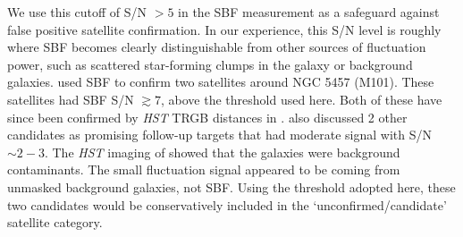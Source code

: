 \documentclass[twocolumn]{aastex62}
\begin{document}
We use this cutoff of S/N $>5$ in the SBF measurement as a safeguard against false positive satellite confirmation. In our experience, this S/N level is roughly where SBF becomes clearly distinguishable from other sources of fluctuation power, such as scattered star-forming clumps in the galaxy or background galaxies. \citet{sbf_m101} used SBF to confirm two satellites around NGC 5457 (M101). These satellites had SBF S/N $\gtrsim7$, above the threshold used here. Both of these have since been confirmed by \emph{HST} TRGB distances in \citet{bennet2019}. \citet{sbf_m101} also discussed 2 other candidates as promising follow-up targets that had moderate signal with S/N$\sim2-3$. The \emph{HST} imaging of \citet{bennet2019} showed that the galaxies were background contaminants. The small fluctuation signal appeared to be coming from unmasked background galaxies, not SBF. Using the threshold adopted here, these two candidates would be conservatively included in the `unconfirmed/candidate' satellite category.


\end{document}
